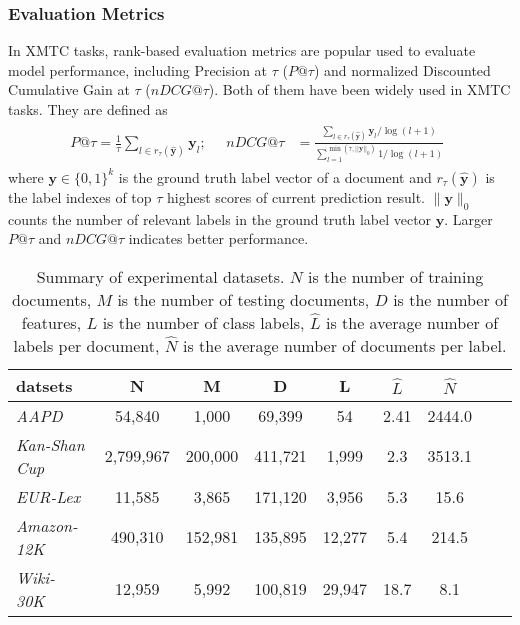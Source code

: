 \documentclass[runningheads]{llncs}
\begin{document}
\vspace{-4mm}
\subsubsection{Evaluation Metrics}
In XMTC tasks, 
rank-based evaluation metrics are popular used to evaluate model performance, including Precision at $\tau$ ($P@\tau$) and normalized Discounted Cumulative Gain at $\tau$ ($nDCG@\tau$). Both of them have been widely used in XMTC tasks. They are defined as 
\begin{gather}\label{precK}
P@\tau=\frac { 1 }{ \tau } \sum _{ l\in { r }_{ \tau }(\bm{\mathbf{\hat{y} } }) }{ { \mathbf{y} }_{ l } } ; \quad 
\begin{split}
nDCG@\tau &= \frac{\sum_{l \in r_\tau(\mathbf{\hat{y}})}  \mathbf{y}_l / \log (l+1)}{ \sum_{l=1}^{\min (\tau,||\mathbf{y}||_0)} 1 / \log(l+1)}
\end{split}
\end{gather}
where $\mathbf{y}\in \{ 0,1\} ^{ k}$ is the ground truth label vector of a document and ${ r }_{ \tau }(\bm{\hat { y } })$ is the label indexes of top $\tau$ highest scores of current prediction result.
$\parallel \mathbf{y}\parallel _{ 0 }$ counts the number of relevant labels in the ground truth label vector $\mathbf{y}$. Larger $P@\tau$ and $nDCG@\tau$ indicates better performance.
\vspace{-4mm}
\begin{table}[tbp]
\renewcommand\tabcolsep{4.0pt}
\footnotesize
\centering
\caption{Summary of experimental datasets. $N$ is the number of training documents, $M$ is the number of testing documents, $D$ is the number of features, $L$ is the number of class labels, $\hat { L }$ is the average number of labels per document, $\hat { N } $ is the average number of documents per label.}\label{table1}
\begin{tabular}{lcccccccc}
	\hline
	datsets &  N & M& D& L& $\hat {L} $&$\hat{N} $\\
	\hline
	\textit{AAPD}~\cite{ref_article2} &  54,840 & 1,000 & 69,399 & 54 & 2.41 & 2444.0\\
\textit{Kan-Shan Cup}~\footnotemark[2] &  2,799,967 & 200,000& 411,721 & 1,999& 2.3  & 3513.1  \\
	\textit{EUR-Lex}~\cite{ref_article3} &  11,585 & 3,865&  171,120&  3,956&  5.3&  15.6\\
	\textit{Amazon-12K}~\cite{ref_article5} &  490,310 & 152,981&  135,895&  12,277&  5.4&  214.5\\
	\textit{Wiki-30K}~\cite{ref_article4} &  12,959 & 5,992&  100,819&  29,947&  18.7&  8.1\\
\hline
\end{tabular}
\end{table}
\end{document}

